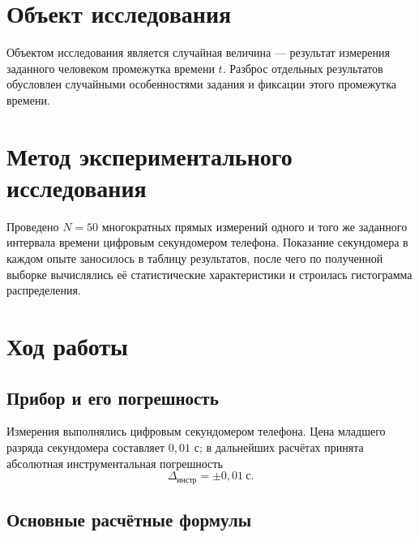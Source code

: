 \documentclass[a4paper,14pt]{extarticle}
\begin{document}
	\section{Объект исследования}
	Объектом исследования является случайная величина --- результат измерения заданного человеком промежутка времени $t$. Разброс отдельных результатов обусловлен случайными особенностями задания и фиксации этого промежутка времени.

	\section{Метод экспериментального исследования}
	Проведено $N=50$ многократных прямых измерений одного и того же заданного интервала времени цифровым секундомером телефона. Показание секундомера в каждом опыте заносилось в таблицу результатов, после чего по полученной выборке вычислялись её статистические характеристики и строилась гистограмма распределения.

	\section{Ход работы}

	\subsection{Прибор и его погрешность}
	Измерения выполнялись цифровым секундомером телефона. Цена младшего разряда секундомера составляет $0{,}01$ с; в дальнейших расчётах принята абсолютная инструментальная погрешность
	\[
	\Delta_{\text{инстр}} = \pm 0{,}01\ \text{с}.
	\]
	
	\subsection{Основные расчётные формулы}
	
\end{document}
